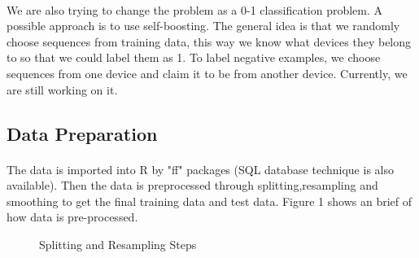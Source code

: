 \documentclass{article}
\begin{document}
	\paragraph{} We are also trying to change the problem as a 0-1 classification problem. A possible approach is to use self-boosting. The general idea is that we randomly choose sequences from training data, this way we know what devices they belong to so that we could label them as 1. To label negative examples, we choose sequences from one device and claim it to be from another device. Currently, we are still working on it. 
	
		\subsection{Data Preparation} %
		\label{sub:idea}
		\paragraph{} The data is imported into R by "ff" packages (SQL database technique is also available). Then the data is preprocessed through splitting,resampling and smoothing to get the final training data and test data. Figure 1 shows an brief of how data is pre-processed.
		
		\begin{figure}
			\centering
			\caption{Splitting and Resampling Steps}
		\end{figure}
		
\end{document}
